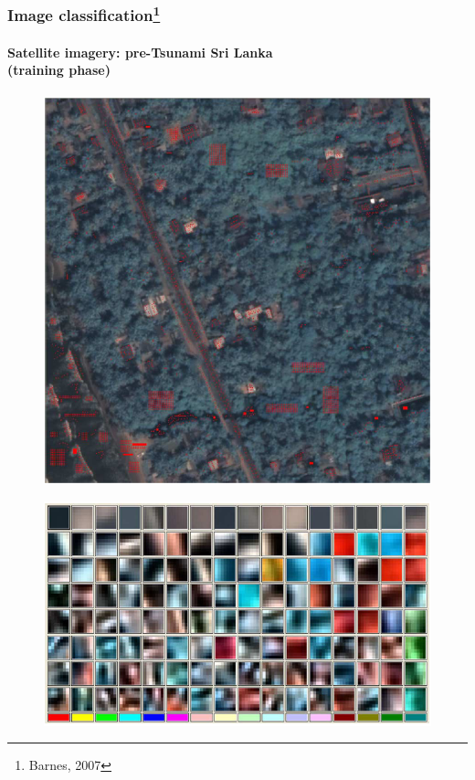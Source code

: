 \begin{frame}
\frametitle{Image classification\footnote{Barnes, 2007}}
\framesubtitle{\small Satellite imagery: pre-Tsunami Sri Lanka \\(training phase)}
\mypagenum{}
	\begin{figure}		
		\includegraphics[height=0.3\textheight]{figs/RVQ_SatelliteSriLanka_1_snippets.png}			
	\end{figure}
	\begin{figure}		
		\includegraphics[height=0.35\textheight]{figs/RVQ_SatelliteSriLanka_2_codebooks.png}			
	\end{figure}
\end{frame}


